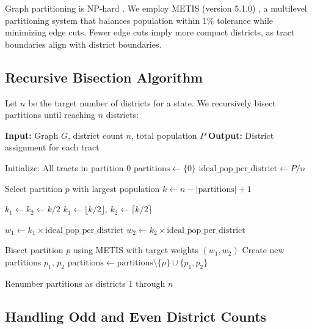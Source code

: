 Graph partitioning is NP-hard \cite{karypis1998fast}. We employ METIS (version 5.1.0) \cite{karypis1995metis}, a multilevel partitioning system that balances population within 1\% tolerance while minimizing edge cuts. Fewer edge cuts imply more compact districts, as tract boundaries align with district boundaries.

\subsection{Recursive Bisection Algorithm}

Let $n$ be the target number of districts for a state. We recursively bisect partitions until reaching $n$ districts:

\begin{algorithm}[H]
\caption{Recursive Bisection Redistricting}
\begin{algorithmic}[1]
\State \textbf{Input:} Graph $G$, district count $n$, total population $P$
\State \textbf{Output:} District assignment for each tract

\State Initialize: All tracts in partition 0
\State $\text{partitions} \gets \{0\}$
\State $\text{ideal\_pop\_per\_district} \gets P / n$

    \State Select partition $p$ with largest population
    \State $k \gets n - |\text{partitions}| + 1$ 

        \State $k_1 \gets k_2 \gets k / 2$ 
    \Else
        \State $k_1 \gets \lfloor k / 2 \rfloor$, $k_2 \gets \lceil k / 2 \rceil$ 
    \EndIf

    \State $w_1 \gets k_1 \times \text{ideal\_pop\_per\_district}$
    \State $w_2 \gets k_2 \times \text{ideal\_pop\_per\_district}$

    \State Bisect partition $p$ using METIS with target weights $(w_1, w_2)$
    \State Create new partitions $p_1$, $p_2$
    \State $\text{partitions} \gets \text{partitions} \setminus \{p\} \cup \{p_1, p_2\}$
\EndWhile

\State Renumber partitions as districts 1 through $n$
\end{algorithmic}
\end{algorithm}

\subsection{Handling Odd and Even District Counts}


